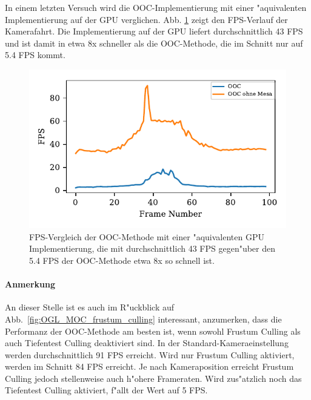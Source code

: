 \documentclass[journal]{vgtc}
\begin{document}
In einem letzten Versuch wird die OOC-Implementierung mit einer "aquivalenten Implementierung auf der GPU verglichen. Abb. \ref{fig:mesa_gpu} zeigt den FPS-Verlauf der Kamerafahrt. Die Implementierung auf der GPU liefert durchschnittlich 43 FPS und ist damit in etwa 8x schneller als die OOC-Methode, die im Schnitt nur auf 5.4 FPS kommt.

\begin{figure}
		\includegraphics[width=\columnwidth]{images/Evaluation_6_Results_OOC_Mesa_FPS.pdf}
		\caption{FPS-Vergleich der OOC-Methode mit einer "aquivalenten GPU Implementierung, die mit durchschnittlich 43 FPS gegen"uber den 5.4 FPS der OOC-Methode etwa 8x so schnell ist.}
		\label{fig:mesa_gpu}
\end{figure}

\paragraph{Anmerkung} An dieser Stelle ist es auch im R"uckblick auf Abb.\ \ref{fig:OGL_MOC_frustum_culling} interessant, anzumerken, dass die Performanz der OOC-Methode am besten ist, wenn sowohl Frustum Culling als auch Tiefentest Culling deaktiviert sind. In der Standard-Kameraeinstellung werden durchschnittlich 91 FPS erreicht. Wird nur Frustum Culling aktiviert, werden im Schnitt 84 FPS erreicht.
Je nach Kameraposition erreicht Frustum Culling jedoch stellenweise auch h"ohere Frameraten.
Wird zus"atzlich noch das Tiefentest Culling aktiviert, f"allt der Wert auf 5 FPS.\\
\end{document}
